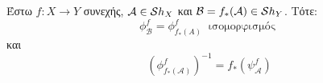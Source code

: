 \begin{figure}[H]
    \centering
\end{figure}

\begin{lemma} Έστω $f:X\longrightarrow Y$ συνεχής, $\mathcal{A} \in \mathcal{S} h_X$ και $\mathcal{B} = f_*(\mathcal{A})\in \mathcal{S} h_Y$. Τότε:
    $$\phi^f_{\mathcal{B}} = \phi^f_{f_*(A)} \ \text{ ισομορφισμός }$$ και
    $$\left(\phi^f_{f_*(\mathcal A)} \right)^{-1} = f_*(\psi^f_{\mathcal{A}})$$
\end{lemma}

